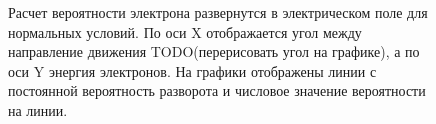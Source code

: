 \begin{figure}[ph!]
    \begin{center}
        \begin{minipage}[h]{0.49\linewidth}
        \end{minipage}
        \hfill
        \begin{minipage}[h]{0.49\linewidth}
        \end{minipage}
        \vfill
        \begin{minipage}[h]{0.49\linewidth}
        \end{minipage}
        \hfill
        \begin{minipage}[h]{0.49\linewidth}
        \end{minipage}
        \vfill
        \begin{minipage}[h]{0.49\linewidth}
        \end{minipage}
        \hfill
        \begin{minipage}[h]{0.49\linewidth}
        \end{minipage}
        \caption{Расчет вероятности электрона развернутся в электрическом поле для нормальных условий. По оси X отображается угол между направление движения TODO(перерисовать угол на графике), а по оси Y энергия электронов. На графики отображены линии с постоянной вероятность разворота и числовое значение вероятности на линии.}
    \end{center}
    \label{fig:storm:reverse_nc_1}
\end{figure}
